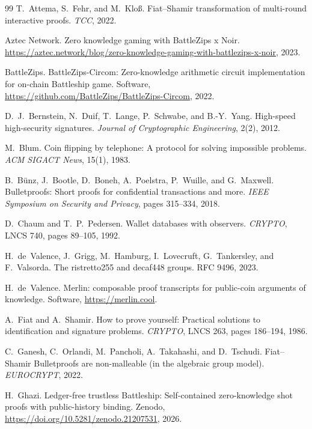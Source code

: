 \documentclass[11pt]{article}
\theoremstyle{definition}
\theoremstyle{remark}
\begin{document}
\begin{thebibliography}{99}
T.~Attema, S.~Fehr, and M.~Klo\ss.
\newblock Fiat--Shamir transformation of multi-round interactive proofs.
\newblock \emph{TCC}, 2022.

Aztec Network.
\newblock Zero knowledge gaming with BattleZips x Noir.
\newblock \url{https://aztec.network/blog/zero-knowledge-gaming-with-battlezips-x-noir}, 2023.

BattleZips.
\newblock BattleZips-Circom: Zero-knowledge arithmetic circuit implementation for on-chain Battleship game.
\newblock Software, \url{https://github.com/BattleZips/BattleZips-Circom}, 2022.

D.~J.~Bernstein, N.~Duif, T.~Lange, P.~Schwabe, and B.-Y.~Yang.
\newblock High-speed high-security signatures.
\newblock \emph{Journal of Cryptographic Engineering}, 2(2), 2012.

M.~Blum.
\newblock Coin flipping by telephone: A protocol for solving impossible problems.
\newblock \emph{ACM SIGACT News}, 15(1), 1983.

B.~B\"unz, J.~Bootle, D.~Boneh, A.~Poelstra, P.~Wuille, and G.~Maxwell.
\newblock Bulletproofs: Short proofs for confidential transactions and more.
\newblock \emph{IEEE Symposium on Security and Privacy}, pages 315--334, 2018.

D.~Chaum and T.~P.~Pedersen.
\newblock Wallet databases with observers.
\newblock \emph{CRYPTO}, LNCS 740, pages 89--105, 1992.

H.~de~Valence, J.~Grigg, M.~Hamburg, I.~Lovecruft, G.~Tankersley, and F.~Valsorda.
\newblock The ristretto255 and decaf448 groups.
\newblock RFC 9496, 2023.

H.~de~Valence.
\newblock Merlin: composable proof transcripts for public-coin arguments of knowledge.
\newblock Software, \url{https://merlin.cool}.

A.~Fiat and A.~Shamir.
\newblock How to prove yourself: Practical solutions to identification and signature problems.
\newblock \emph{CRYPTO}, LNCS 263, pages 186--194, 1986.

C.~Ganesh, C.~Orlandi, M.~Pancholi, A.~Takahashi, and D.~Tschudi.
\newblock Fiat--Shamir Bulletproofs are non-malleable (in the algebraic group model).
\newblock \emph{EUROCRYPT}, 2022.

H.~Ghazi.
\newblock Ledger-free trustless Battleship: Self-contained zero-knowledge shot proofs with public-history binding.
\newblock Zenodo, \url{https://doi.org/10.5281/zenodo.21207531}, 2026.


\end{thebibliography}
\end{document}
